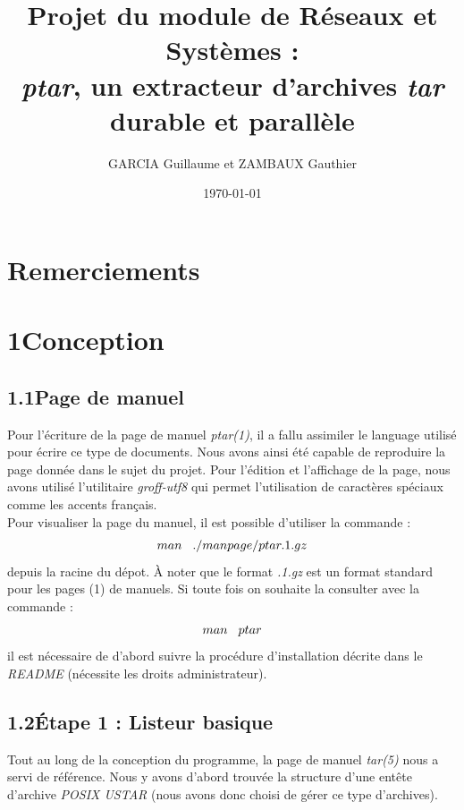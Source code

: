 \documentclass[12pt, a4paper]{report}
\title{Projet du module de Réseaux et Systèmes :\\ \textit{ptar}, un extracteur d'archives \textit{tar} durable et parallèle}
\author{GARCIA  Guillaume et ZAMBAUX Gauthier}
\date{\today}
\begin{document}
\maketitle



\chapter*{Remerciements}


\chapter*{1\hspace{1cm}Conception}

\section*{\hspace{0.6cm}1.1\hspace{0.6cm}Page de manuel}
\hspace{1cm}Pour l'écriture de la page de manuel \textit{ptar(1)}, il a fallu assimiler le language utilisé pour écrire ce type de documents. Nous avons ainsi été capable de reproduire la page donnée dans le sujet du projet. Pour l'édition et l'affichage de la page, nous avons utilisé l'utilitaire \textit{groff-utf8} qui permet l'utilisation de caractères spéciaux comme les accents français. \\

\hspace{0.5cm}Pour visualiser la page du manuel, il est possible d'utiliser la commande : \[man\hspace{0.3cm}./manpage/ptar.1.gz\]  depuis la racine du dépot. À noter que le format \textit{.1.gz} est un format standard pour les pages (1) de manuels. Si toute fois on souhaite la consulter avec la commande : \[man\hspace{0.3cm}ptar\] il est nécessaire de d'abord suivre la procédure d'installation décrite dans le \textit{README} (nécessite les droits administrateur).

\section*{\hspace{0.6cm}1.2\hspace{0.6cm}Étape 1 : Listeur basique}
\hspace{1cm}Tout au long de la conception du programme, la page de manuel \textit{tar(5)} nous a servi de référence. Nous y avons d'abord trouvée la structure d'une entête d'archive \textit{POSIX USTAR} (nous avons donc choisi de gérer ce type d'archives). \\
\end{document}
